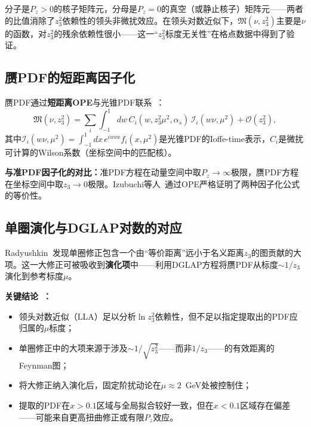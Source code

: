 \documentclass[12pt,a4paper]{ctexart}
\theoremstyle{definition}
\begin{document}
分子是$P_z > 0$的核子矩阵元，分母是$P_z = 0$的真空（或静止核子）矩阵元——两者的比值消除了$z_3^2$依赖性的领头非微扰效应。在领头对数近似下，$\mathfrak{M}(\nu, z_3^2)$主要是$\nu$的函数，对$z_3^2$的残余依赖性很小——这一``$z_3^2$标度无关性''在格点数据中得到了验证。

\subsection{赝PDF的短距离因子化}

赝PDF通过\textbf{短距离OPE}与光锥PDF联系~\cite{Radyushkin2018oneLoop}：
\begin{equation}
\mathfrak{M}(\nu, z_3^2) = \sum_i \int_{-1}^1 dw\, C_i(w, z_3^2\mu^2, \alpha_s)\, \mathcal{I}_i(w\nu, \mu^2) + \mathcal{O}(z_3^2),
\label{eq:pseudo_factorization}
\end{equation}
其中$\mathcal{I}_i(w\nu, \mu^2) = \int_{-1}^1 dx\, e^{iw\nu x} f_i(x, \mu^2)$是光锥PDF的Ioffe-time表示，$C_i$是微扰可计算的Wilson系数（坐标空间中的匹配核）。

\textbf{与准PDF因子化的对比：}准PDF方程在动量空间中取$P_z \to \infty$极限，赝PDF方程在坐标空间中取$z_3 \to 0$极限。Izubuchi等人~\cite{Izubuchi2018}通过OPE严格证明了两种因子化公式的等价性。

\subsection{单圈演化与DGLAP对数的对应}

Radyushkin~\cite{Radyushkin2018oneLoop}发现单圈修正包含一个由``等价距离''远小于名义距离$z_3$的图贡献的大项。这一大修正可被吸收到\textbf{演化项}中——利用DGLAP方程将赝PDF从标度$\sim 1/z_3$演化到参考标度$\mu$。

\textbf{关键结论~\cite{Radyushkin2018oneLoop}：}
\begin{itemize}
    \item 领头对数近似（LLA）足以分析$\ln z_3^2$依赖性，但不足以指定提取出的PDF应归属的$\mu$标度；
    \item 单圈修正中的大项来源于涉及$\sim 1/\sqrt{z_3^2}$——而非$1/z_3$——的有效距离的Feynman图；
    \item 将大修正纳入演化后，固定阶扰动论在$\mu \approx 2$~GeV处被控制住；
    \item 提取的PDF在$x > 0.1$区域与全局拟合较好一致，但在$x < 0.1$区域存在偏差——可能来自更高扭曲修正或有限$P_z$效应。
\end{itemize}

\end{document}

